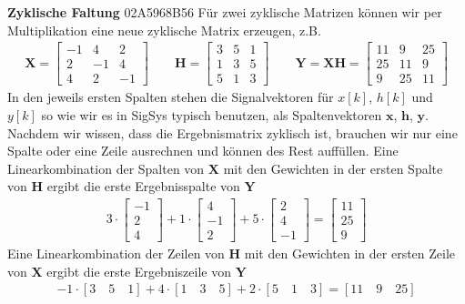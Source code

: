 \textbf{Zyklische Faltung} {\tiny 02A5968B56}
Für zwei zyklische Matrizen können wir per Multiplikation eine
neue zyklische Matrix erzeugen, z.B.
\begin{align}
\bm{X} =
\begin{bmatrix}
-1 &  4 &  2\\
 2 & -1 &  4\\
 4 &  2 & -1
\end{bmatrix}
\qquad
\bm{H} =
\begin{bmatrix}
3 & 5 & 1\\
1 & 3 & 5\\
5 & 1 & 3
\end{bmatrix}
\qquad
\bm{Y} = \bm{X}\bm{H} =
\begin{bmatrix}
11  &   9  &  25\\
25  &  11  &  9\\
 9  &  25  &  11
\end{bmatrix}
\end{align}
In den jeweils ersten Spalten stehen die Signalvektoren für $x[k]$, $h[k]$ und $y[k]$
so wie wir es in SigSys typisch benutzen, als Spaltenvektoren $\bm{x}$, $\bm{h}$, $\bm{y}$.
%
Nachdem wir wissen, dass die Ergebnismatrix zyklisch ist, brauchen wir nur
eine Spalte oder eine Zeile ausrechnen und können des Rest auffüllen.
%
Eine Linearkombination der Spalten von $\bm{X}$ mit den Gewichten in der
ersten Spalte von $\bm{H}$ ergibt die erste Ergebnisspalte von $\bm{Y}$
\begin{align}
3\cdot
\begin{bmatrix}
-1\\
 2\\
 4
\end{bmatrix}
+
1\cdot
\begin{bmatrix}
4\\
-1\\
2
\end{bmatrix}
+5\cdot
\begin{bmatrix}
2\\
4\\
-1
\end{bmatrix}
=
\begin{bmatrix}
11\\
25\\
 9
\end{bmatrix}
\end{align}
Eine Linearkombination der Zeilen von $\bm{H}$ mit den Gewichten in der ersten Zeile
von $\bm{X}$ ergibt die erste Ergebniszeile von $\bm{Y}$
\begin{align}
\label{eq:C8864C8D9F_LinComb_Row}
-1 \cdot [3 \quad 5 \quad 1] + 4 \cdot [1 \quad 3 \quad 5] + 2 \cdot [5 \quad 1 \quad 3] =
[11 \quad 9 \quad 25]
\end{align}
